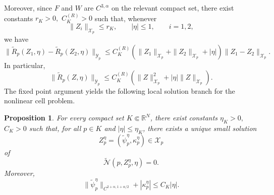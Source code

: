 \documentclass[preprint]{elsarticle}
\newtheorem{proposition}{Proposition}[section]
\numberwithin{equation}{section}
\begin{document}
Moreover, since $F$ and $W$ are $C^{3,\alpha}$ on the relevant compact set, there exist constants
$
r_K>0,
$ $
C_K^{(R)}>0
$
such that, whenever
$$
\|Z_i\|_{\mathcal X_p}\le r_K,
\qquad
|\eta|\le1,
\qquad
i=1,2,
$$
we have
\begin{equation*}
\|\widetilde R_p(Z_1,\eta)-\widetilde R_p(Z_2,\eta)\|_{\mathcal Y_p}
\le
C_K^{(R)}
\left(
\|Z_1\|_{\mathcal X_p}
+
\|Z_2\|_{\mathcal X_p}
+
|\eta|
\right)
\|Z_1-Z_2\|_{\mathcal X_p}.
\end{equation*}
In particular,
\begin{equation*}
\|\widetilde R_p(Z,\eta)\|_{\mathcal Y_p}
\le
C_K^{(R)}
\left(
\|Z\|_{\mathcal X_p}^2
+
|\eta|\|Z\|_{\mathcal X_p}
\right).
\end{equation*}
The fixed point argument yields the following local solution branch for the nonlinear cell problem.

\begin{proposition}
For every compact set $K\Subset\mathbb R^N$, there exist constants
$
\eta_K>0,
$ $
C_K>0
$
such that, for all $p\in K$ and $|\eta|\le\eta_K$, there exists a unique small solution
$$
Z_p^\eta=(\widetilde\psi_p^\eta,\kappa_p^\eta)\in\mathcal X_p
$$
of
\begin{equation*}
\widetilde{\mathcal N}(p,Z_p^\eta,\eta)=0.
\end{equation*}
Moreover,
\begin{equation*}
\|\widetilde\psi_p^\eta\|_{C^{2+\alpha,1+\alpha/2}}
+
|\kappa_p^\eta|
\le
C_K|\eta|.
\end{equation*}\label{estimate}
\end{proposition}
\end{document}
